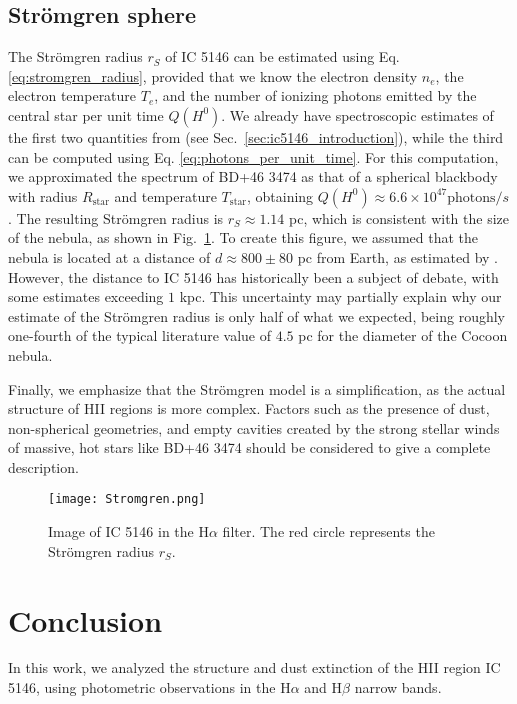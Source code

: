 \documentclass[fleqn,usenatbib]{mnras}
\begin{document}
\subsection{Strömgren sphere}\label{sec:stromgren_results}
The Strömgren radius $r_S$ of IC 5146 can be estimated using Eq. \ref{eq:stromgren_radius}, provided that we know the electron density $n_e$, the electron temperature $T_e$, and the number of ionizing photons emitted by the central star per unit time $Q (H^0)$.
We already have spectroscopic estimates of the first two quantities from \cite{Garcia-Rojas_2014} (see Sec.~\ref{sec:ic5146_introduction}), while the third can be computed using Eq. \ref{eq:photons_per_unit_time}.
For this computation, we approximated the spectrum of BD+46 3474 as that of a spherical blackbody with radius $R_\text{star}$ and temperature $T_\text{star}$, obtaining $Q (H^0) \approx 6.6 \times 10^{47} \text{photons}/s$.
The resulting Strömgren radius is $r_S \approx 1.14$ pc, which is consistent with the size of the nebula, as shown in Fig.~\ref{fig:Stromgren}. 
To create this figure, we assumed that the nebula is located at a distance of $d \approx 800 \pm 80$ pc from Earth, as estimated by \cite{Garcia-Rojas_2014}.
However, the distance to IC 5146 has historically been a subject of debate, with some estimates exceeding $1$ kpc.
This uncertainty may partially explain why our estimate of the Strömgren radius is only half of what we expected, being roughly one-fourth of the typical literature value of $4.5$ pc for the diameter of the Cocoon nebula.

Finally, we emphasize that the Strömgren model is a simplification, as the actual structure of HII regions is more complex.
Factors such as the presence of dust, non-spherical geometries, and empty cavities created by the strong stellar winds of massive, hot stars like BD+46 3474 should be considered to give a complete description.


\begin{figure}\centering
	\texttt{[image: Stromgren.png]}
    \caption{Image of IC 5146 in the H$\alpha$ filter. The red circle represents the Strömgren radius $r_S$.}
    \label{fig:Stromgren}
\end{figure}



\section{Conclusion}\label{sec:conclusion}
In this work, we analyzed the structure and dust extinction of the HII region IC 5146, using photometric observations in the H$\alpha$ and H$\beta$ narrow bands.
\end{document}

